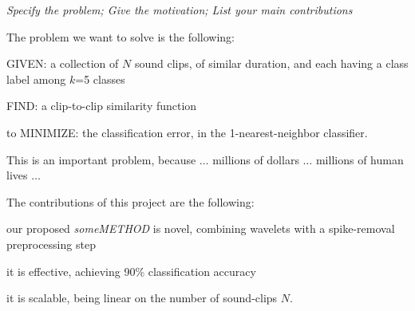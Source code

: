 {\small \em Specify the problem; Give the motivation; 
List your main contributions}

The problem we want to solve is the following:
\bit
\item GIVEN: a collection of $N$ sound clips, of similar duration,
      and each having a class label among $k$=5 classes
\item FIND: a clip-to-clip similarity function
\item to MINIMIZE: the classification error, in the 1-nearest-neighbor
      classifier.
\eit

This is an important problem, because $\ldots$
millions of dollars $\ldots$
millions of human lives $\ldots$

The contributions of this project are the following:
\bit
\item our proposed {\em someMETHOD} is novel, combining wavelets
      with a spike-removal  preprocessing step
\item it is effective, achieving 90\% classification accuracy
\item it is scalable, being linear on the number of sound-clips $N$.
\eit
